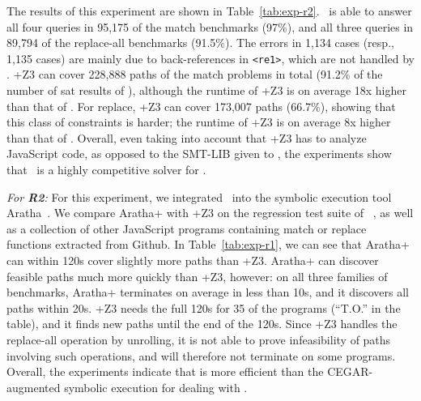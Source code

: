 The results of this experiment are shown in
Table~\ref{tab:exp-r2}. \ostrich\ is able to answer all four queries
in 95,175 of the match benchmarks (97\%), and all three queries in
89,794 of the replace-all benchmarks (91.5\%). The errors in 1,134
cases (resp., 1,135 cases) are mainly due to back-references in
\verb!<re1>!, which are not handled by \ostrich. \expose{}+Z3 can
cover 228,888 paths of the match problems in total (91.2\% of the
number of sat results of \ostrich), although the runtime of
\expose{}+Z3 is on average 18x higher than that of \ostrich. For
replace, \expose{}+Z3 can cover 173,007 paths (66.7\%), showing that
this class of constraints is harder; the runtime of \expose{}+Z3 is on
average 8x higher than that of \ostrich.  Overall, even taking into
account that \expose{}+Z3 has to analyze JavaScript code, as opposed
to the SMT-LIB given to \ostrich, the experiments show that \ostrich\
is a highly competitive solver for \regexps.

\smallskip
{\em For \textbf{R2}:} For this experiment,
we  integrated \ostrich\ into the symbolic
execution tool Aratha~\cite{aratha}.  We compare Aratha+{\ostrich} with
\expose{}+Z3 on the regression test suite of \expose{}~\cite{DBLP:conf/spin/LoringMK17},
as well as a collection of other JavaScript programs containing match or replace
functions extracted from Github. In
Table~\ref{tab:exp-r1}, we can see that Aratha+{\ostrich} can within
120s cover slightly more paths than \expose{}+Z3. Aratha+{\ostrich} can
discover feasible paths much more quickly than \expose{}+Z3, however: on
all three families of benchmarks, Aratha+{\ostrich} terminates on
average in less than 10s, and it discovers all paths
within 20s. \expose{}+Z3 needs the full 120s for
35 of the programs (``T.O.'' in the table),
and it finds new paths until the end of the 120s. Since \expose{}+Z3
handles the replace-all operation by unrolling, it is not able to
prove infeasibility of paths involving such operations, and will
therefore not terminate on some programs.
Overall, the experiments indicate that {\ostrich} is more
efficient than the CEGAR-augmented symbolic execution for dealing
with \regexps.



